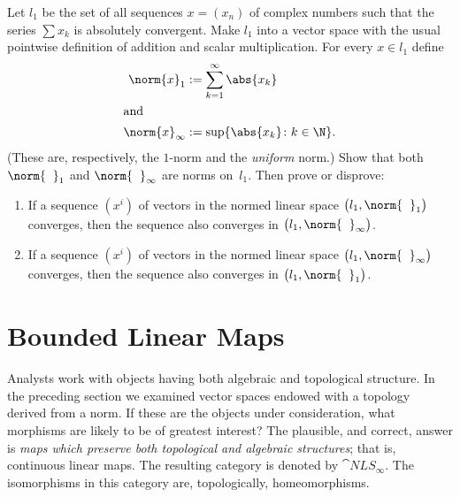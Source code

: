 \begin{exer}\label{C023191} Let
$l_1$ be the set of all sequences $x = (x_n)$ of complex numbers such that the series $\sum x_k$ is absolutely
convergent. Make $l_1$ into a vector space with the usual pointwise definition of addition and scalar multiplication.
For every $x \in l_1$ define
   \begin{align*}
      \norm{x}_1 &:= \sum_{k=1}^\infty \abs{x_k} \\
   \intertext{and}
      \norm{x}_\infty &:= \sup\{\abs{x_k}\colon k \in \N\}.
   \end{align*}
(These are, respectively, the
$1$-norm and the
\emph{uniform} norm.) Show that both $\norm{\hphantom{x}}_1$ and $\norm{\hphantom{x}}_\infty$
are norms on~$l_1$. Then prove or disprove:
 \begin{enumerate}
  \item[(a)] If a sequence $(x^i)$ of vectors in the normed linear space
$\bigl(l_1, \norm{\hphantom{x}}_1\bigr)$ converges, then the sequence also converges in
$\bigl(l_1, \norm{\hphantom{x}}_\infty\bigr)$.
  \item[(b)] If a sequence $(x^i)$ of vectors in the normed linear space
$\bigl(l_1, \norm{\hphantom{x}}_\infty\bigr)$ converges, then the sequence also converges in
$\bigl(l_1, \norm{\hphantom{x}}_1\bigr)$.
 \end{enumerate}
\end{exer}









\section{Bounded Linear Maps}\label{sec_bdd_lin_maps}
Analysts work with objects having both algebraic and topological structure.  In the
preceding section we examined vector spaces endowed with a topology derived from a norm.
If these are the objects under consideration, what morphisms are likely to be of greatest
interest?  The plausible, and correct, answer is \emph{maps which preserve both
topological and algebraic structures}; that is, continuous linear maps.  The resulting
category is denoted by
$\cat{NLS_{\boldsymbol\infty}}$.  The isomorphisms in this category are, topologically,
homeomorphisms.

